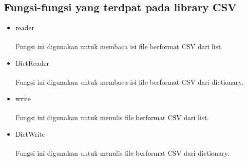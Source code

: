\documentclass{article}
\begin{document}
    \subsection{Fungsi-fungsi yang terdpat pada library CSV}
        \begin{itemize}
            \item reader
                \paragraph{} Fungsi ini digunakan untuk membaca isi file berformat CSV dari list.
                
            \item DictReader
                \paragraph{}  Fungsi ini digunakan untuk membaca isi file berformat CSV dari dictionary.
                
            \item write
                \paragraph{} Fungsi ini digunakan untuk menulis file berformat CSV dari list.
                
            \newpage
            \item DictWrite
                \paragraph{}  Fungsi ini digunakan untuk menulis file berformat CSV dari dictionary.
                
        \end{itemize}
     
\end{document}
